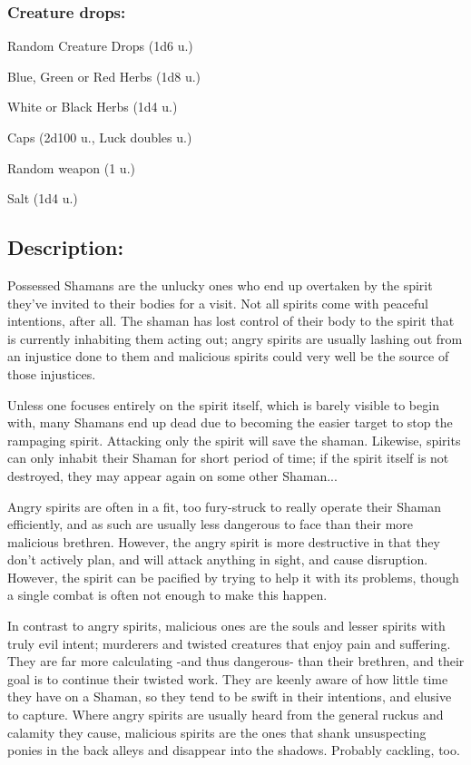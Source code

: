 \documentclass[11pt,a4paper,twocolumn]{book}
\begin{document}
	\subsubsection*{Creature drops:}
	\begin{compactitem}
	\item Random Creature Drops (1d6 u.)
	\item Blue, Green or Red Herbs (1d8 u.)
	\item White or Black Herbs (1d4 u.)
	\item Caps (2d100 u., Luck doubles u.)
	\item Random weapon (1 u.)
	\item Salt (1d4 u.)
	\end{compactitem}

	\subsection*{Description:}
	Possessed Shamans are the unlucky ones who end up overtaken by the spirit they've invited to their bodies for a visit. Not all spirits come with peaceful intentions, after all. The shaman has lost control of their body to the spirit that is currently inhabiting them acting out; angry spirits are usually lashing out from an injustice done to them and malicious spirits could very well be the source of those injustices.
	
	Unless one focuses entirely on the spirit itself, which is barely visible to begin with, many Shamans end up dead due to becoming the easier target to stop the rampaging spirit. Attacking only the spirit will save the shaman. Likewise, spirits can only inhabit their Shaman for short period of time; if the spirit itself is not destroyed, they may appear again on some other Shaman...
	
	\medskip
	
	Angry spirits are often in a fit, too fury-struck to really operate their Shaman efficiently, and as such are usually less dangerous to face than their more malicious brethren. However, the angry spirit is more destructive in that they don't actively plan, and will attack anything in sight, and cause disruption. 
	However, the spirit can be pacified by trying to help it with its problems, though a single combat is often not enough to make this happen. 
	
	\medskip
	
	In contrast to angry spirits, malicious ones are the souls and lesser spirits with truly evil intent; murderers and twisted creatures that enjoy pain and suffering. They are far more calculating -and thus dangerous- than their brethren, and their goal is to continue their twisted work. They are keenly aware of how little time they have on a Shaman, so they tend to be swift in their intentions, and elusive to capture. Where angry spirits are usually heard from the general ruckus and calamity they cause, malicious spirits are the ones that shank unsuspecting ponies in the back alleys and disappear into the shadows. Probably cackling, too.
\end{document}
